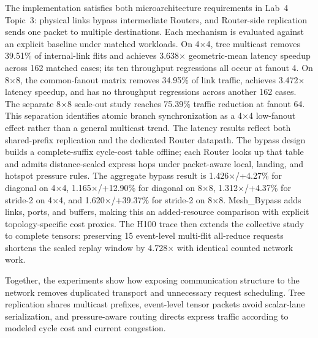 \documentclass[10pt]{article}
\begin{document}
The implementation satisfies both microarchitecture requirements in Lab~4
Topic~3: physical links bypass intermediate Routers, and Router-side
replication sends one packet to multiple destinations.  Each mechanism is
evaluated against an explicit baseline under matched workloads.  On
4$\times$4, tree multicast removes 39.51\% of internal-link flits and achieves
3.638$\times$ geometric-mean latency speedup across 162 matched cases; its ten
throughput regressions all occur at fanout 4.  On 8$\times$8, the common-fanout
matrix removes 34.95\% of link traffic, achieves 3.472$\times$ latency
speedup, and has no throughput regressions across another 162 cases.  The
separate 8$\times$8 scale-out study reaches 75.39\% traffic reduction at
fanout 64.  This separation identifies atomic branch synchronization as a
4$\times$4 low-fanout effect rather than a general multicast trend.  The
latency results reflect both shared-prefix replication and the dedicated
  Router datapath.  The bypass design builds a complete-suffix cycle-cost table
  offline; each Router looks up that table and admits distance-scaled express
  hops under packet-aware local, landing, and hotspot pressure rules.  The
  aggregate bypass result is
  1.426$\times$/+4.27\% for diagonal on 4$\times$4,
  1.165$\times$/+12.90\% for diagonal on 8$\times$8,
  1.312$\times$/+4.37\% for stride-2 on 4$\times$4, and
  1.620$\times$/+39.37\% for stride-2 on 8$\times$8.  Mesh\_Bypass adds links,
  ports, and buffers, making this an added-resource
comparison with explicit topology-specific cost proxies.  The H100 trace
then extends the collective study to complete tensors: preserving 15
event-level multi-flit all-reduce requests shortens the scaled replay window by
4.728$\times$ with identical counted network work.

Together, the experiments show how exposing communication structure to the
network removes duplicated transport and unnecessary request scheduling.
Tree replication shares multicast prefixes, event-level tensor packets avoid
scalar-lane serialization, and pressure-aware routing directs express traffic
according to modeled cycle cost and current congestion.
\end{document}
